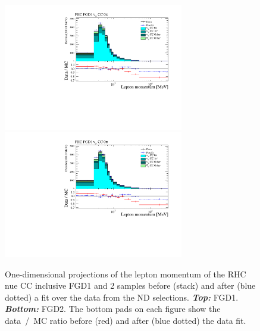 \begin{figure}[ht]
  \center
  \includegraphics[keepaspectratio=true,width=0.7\textwidth,page=23]{images/BANFF/reactionCodeStacks_PrefitAndPostfit_mom.pdf}\\
  \includegraphics[keepaspectratio=true,width=0.7\textwidth,page=24]{images/BANFF/reactionCodeStacks_PrefitAndPostfit_mom.pdf}\\
  \begin{center}
    \caption[RHC $\nu_e$ FGD1 and 2 samples before and after a fit
    over the data from the ND selections]{One-dimensional projections
      of the lepton momentum of the \Gls{RHC} \Gls{nue} \Gls{CC}
      inclusive \Gls{FGD}1 and 2 samples before (stack) and after
      (blue dotted) a fit over the data from the \Gls{ND}
      selections. \textbf{\textit{Top:}}
      \Gls{FGD}1. \textbf{\textit{Bottom:}} \Gls{FGD}2. The bottom
      pads on each figure show the data~/~\Gls{MC} ratio before (red)
      and after (blue dotted) the data fit.}
    \label{fig:nuebkg}
  \end{center}
\end{figure}


